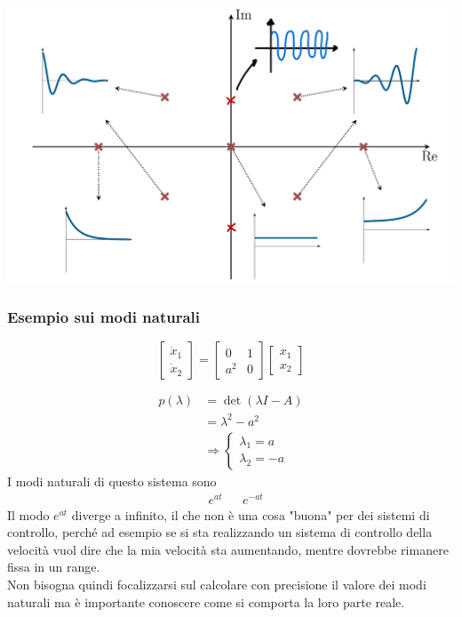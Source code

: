 \documentclass{article}
\numberwithin{equation}{subsection}
\begin{document}
\begin{center}
    \includegraphics[scale=0.23]{Images/Esempio_autovalori.png}
\end{center}

\subsubsection{Esempio sui modi naturali}
\begin{equation}
    \begin{bmatrix}
        \dot x_1\\
        \dot x_2
    \end{bmatrix}
    =
    \begin{bmatrix}
        0 & 1\\
        a^2 & 0
    \end{bmatrix}
    \begin{bmatrix}
        x_1\\
        x_2
    \end{bmatrix}
\end{equation}

\begin{align*}
    p(\lambda) &= \det (\lambda I -A)\\
    &= \lambda^2 - a^2\\
    &\Rightarrow \begin{cases}
        \lambda_1 = a\\
        \lambda_2 = -a
    \end{cases}
\end{align*}
I modi naturali di questo sistema sono 
\begin{align*}
    &e^{at} & &e^{-at}
\end{align*}
Il modo $e^{at}$ diverge a infinito, il che non è una cosa "buona" per dei sistemi di controllo, perché ad esempio se si sta realizzando un sistema di controllo della velocità vuol dire che la mia velocità sta aumentando, mentre dovrebbe rimanere fissa in un range.\\
Non bisogna quindi focalizzarsi sul calcolare con precisione il valore dei modi naturali ma è importante conoscere come si comporta la loro parte reale.
\end{document}
